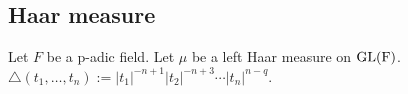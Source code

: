 \subsection{Haar measure}
Let $F$ be a p-adic field.
Let $\mu$ be a left Haar measure on $\rm{GL}(F)$.
$\bigtriangleup (t_1, \ldots, t_n):= |t_1|^{-n+1}|t_2|^{-n+3} \cdots |t_n|^{n-q}$.


